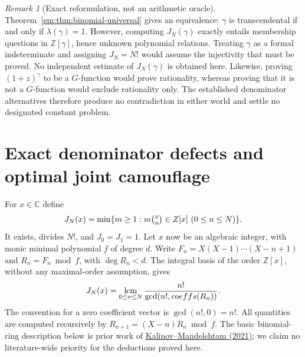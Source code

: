 \documentclass[11pt,a4paper]{article}
\newcommand{\Z}{\mathbb Z}
\theoremstyle{definition}
\theoremstyle{remark}
\newtheorem{remark}[theorem]{Remark}
\theoremstyle{plain}
\numberwithin{equation}{section}
\def\operatorname#1{#1}\def\mathrm#1{#1}}
\begin{document}
\begin{remark}[Exact reformulation, not an arithmetic oracle]
Theorem~\ref{em:thm:binomial-universal} gives an equivalence:
$\gamma$ is transcendental if and only if $\lambda(\gamma)=1$.
However, computing $J_N(\gamma)$ exactly entails membership questions
in $\Z[\gamma]$, hence unknown polynomial relations.  Treating $\gamma$
as a formal indeterminate and assigning $J_N=N!$ would assume the
injectivity that must be proved.  No independent estimate of
$J_N(\gamma)$ is obtained here.  Likewise, proving $(1+z)^\gamma$
to be a $G$-function would prove rationality, whereas proving that it
is not a $G$-function would exclude rationality only.  The established
denominator alternatives therefore produce no contradiction in either
world and settle no designated constant problem.
\end{remark}

\section{Exact denominator defects and optimal joint camouflage}
\label{em:sec:denominator-bridge}

For $x\in\mathbb C$ define
\[
J_N(x)=\min\{m\ge1:m\tbinom xn\in\mathbb Z[x]\ (0\le n\le N)\}.
\]
It exists, divides $N!$, and $J_0=J_1=1$.  Let $x$ now be an algebraic
integer, with monic minimal polynomial $f$ of degree $d$.  Write
$F_n=X(X-1)\cdots(X-n+1)$ and $R_n=F_n\bmod f$, with $\deg R_n<d$.
The integral basis of the order $\mathbb Z[x]$, without any maximal-order
assumption, gives
\begin{equation}\label{em:eq:exact-J}
J_N(x)=\mathop{\rm lcm}_{0\le n\le N}
\frac{n!}{\gcd(n!,\operatorname{coeffs}(R_n))}.
\end{equation}
The convention for a zero coefficient vector is $\gcd(n!,0)=n!$.
All quantities are computed recursively by $R_{n+1}=(X-n)R_n\bmod f$.
The basic binomial-ring description below is prior work of
\href{https://arxiv.org/abs/2010.14494}{Kalinov--Mandelshtam (2021)};
we claim no literature-wide priority for the deductions proved here.
\end{document}
